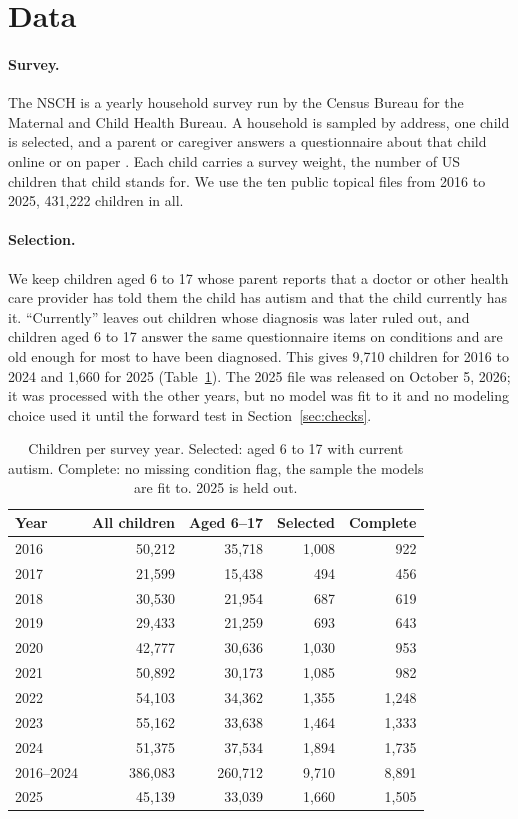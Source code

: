 \section{Data}
\label{sec:data}

\paragraph{Survey.}
The NSCH is a yearly household survey run by the Census Bureau for the Maternal and Child Health Bureau. A household is sampled by address, one child is selected, and a parent or caregiver answers a questionnaire about that child online or on paper \citep{ghandour2018}. Each child carries a survey weight, the number of US children that child stands for. We use the ten public topical files from 2016 to 2025, 431,222 children in all.

\paragraph{Selection.}
We keep children aged 6 to 17 whose parent reports that a doctor or other health care provider has told them the child has autism and that the child currently has it. ``Currently'' leaves out children whose diagnosis was later ruled out, and children aged 6 to 17 answer the same questionnaire items on conditions and are old enough for most to have been diagnosed. This gives 9,710 children for 2016 to 2024 and 1,660 for 2025 (Table~\ref{tab:sample}). The 2025 file was released on October 5, 2026; it was processed with the other years, but no model was fit to it and no modeling choice used it until the forward test in Section~\ref{sec:checks}.

\begin{table}[t]
\centering
\caption{Children per survey year. Selected: aged 6 to 17 with current autism. Complete: no missing condition flag, the sample the models are fit to. 2025 is held out.}
\label{tab:sample}
\small
\begin{tabular}{lrrrr}
\toprule
Year & All children & Aged 6--17 & Selected & Complete \\
\midrule
2016 & 50,212 & 35,718 & 1,008 & 922 \\
2017 & 21,599 & 15,438 & 494 & 456 \\
2018 & 30,530 & 21,954 & 687 & 619 \\
2019 & 29,433 & 21,259 & 693 & 643 \\
2020 & 42,777 & 30,636 & 1,030 & 953 \\
2021 & 50,892 & 30,173 & 1,085 & 982 \\
2022 & 54,103 & 34,362 & 1,355 & 1,248 \\
2023 & 55,162 & 33,638 & 1,464 & 1,333 \\
2024 & 51,375 & 37,534 & 1,894 & 1,735 \\
\midrule
2016--2024 & 386,083 & 260,712 & 9,710 & 8,891 \\
2025 & 45,139 & 33,039 & 1,660 & 1,505 \\
\bottomrule
\end{tabular}
\end{table}

